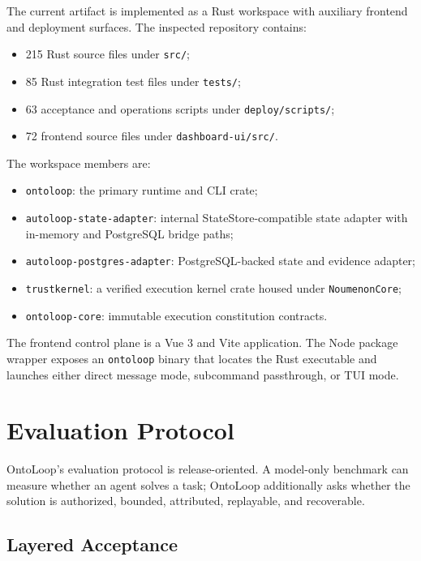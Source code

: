 \documentclass[11pt]{article}
\begin{document}
The current artifact is implemented as a Rust workspace with auxiliary frontend
and deployment surfaces. The inspected repository contains:

\begin{itemize}
  \item 215 Rust source files under \texttt{src/};
  \item 85 Rust integration test files under \texttt{tests/};
  \item 63 acceptance and operations scripts under \texttt{deploy/scripts/};
  \item 72 frontend source files under \texttt{dashboard-ui/src/}.
\end{itemize}

The workspace members are:

\begin{itemize}
  \item \texttt{ontoloop}: the primary runtime and CLI crate;
  \item \texttt{autoloop-state-adapter}: internal StateStore-compatible state
        adapter with in-memory and PostgreSQL bridge paths;
  \item \texttt{autoloop-postgres-adapter}: PostgreSQL-backed state and evidence
        adapter;
  \item \texttt{trustkernel}: a verified execution kernel crate housed under
        \texttt{NoumenonCore};
  \item \texttt{ontoloop-core}: immutable execution constitution contracts.
\end{itemize}

The frontend control plane is a Vue 3 and Vite application. The Node package
wrapper exposes an \texttt{ontoloop} binary that locates the Rust executable and
launches either direct message mode, subcommand passthrough, or TUI mode.

\section{Evaluation Protocol}

OntoLoop's evaluation protocol is release-oriented. A model-only benchmark can
measure whether an agent solves a task; OntoLoop additionally asks whether the
solution is authorized, bounded, attributed, replayable, and recoverable.

\subsection{Layered Acceptance}
\end{document}
